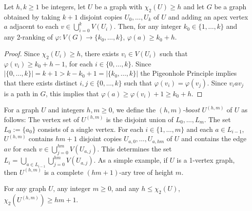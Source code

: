 \documentclass[kpfonts]{patmorin}
\newcommand{\trn}{\chi_2}
\theoremstyle{named}
\begin{document}
\begin{lem}\label{apex-graph}
    Let $h,k\ge 1$ be integers, let $U$ be a graph with $\trn(U)\ge h$ and let $G$ be a graph obtained by taking $k+1$ disjoint copies $U_0,\ldots,U_k$ of $U$ and adding an apex vertex $a$ adjacent to each $v\in\bigcup_{i=0}^k V(U_i)$.  Then, for any integer $k_0\in \{1,\ldots,k\}$ and any 2-ranking of $\varphi:V(G)\to\{k_0,\ldots,k\}$, $\varphi(a) \ge k_0+h$.
\end{lem}

\begin{proof}
    Since $\trn(U_i)\ge h$, there exists $v_i\in V(U_i)$ such that $\varphi(v_i)\ge k_0+h-1$, for each $i\in\{0,\ldots,k\}$.  Since $|\{0,\ldots,k\}|=k+1>k-k_0+1=|\{k_0,\ldots,k\}|$ the Pigeonhole Principle implies that there exists distinct $i,j\in\{0,\ldots,k\}$ such that $\varphi(v_i)=\varphi(v_j)$.  Since $v_i a v_j$ is a path in $G$, this implies that $\varphi(a)\ge \varphi(v_i)+1\ge k_0+h$.
\end{proof}


For a graph $U$ and integers $h,m\ge 0$, we define the \emph{$(h,m)$-boost} $U^{(h,m)}$ of $U$ as follows: The vertex set of $U^{(h,m)}$ is the disjoint union of $L_0,\ldots,L_m$.  The set $L_0:=\{a_0\}$ consists of a single vertex. For each $i\in\{1,\ldots,m\}$ and each $a\in L_{i-1}$, $U^{(h,m)}$ contains $hm+1$ disjoint copies $U_{a,0},\ldots,U_{a,hm}$ of $U$ and contains the edge $av$ for each $v\in\bigcup_{j=0}^{hm} V(U_{a,j})$.  This determines the set $L_i=\bigcup_{a\in L_{i-1}}\bigcup_{j=0}^{hm} V(U_{a,j})$.  As a simple example, if $U$ is a 1-vertex graph, then $U^{(h,m)}$ is a complete $(hm+1)$-ary tree of height $m$.

\begin{lem}\label{boost}
    For any graph $U$, any integer $m\ge 0$, and any $h\le\trn(U)$, $\trn(U^{(h,m)})\ge hm +1$.
\end{lem}
\end{document}
